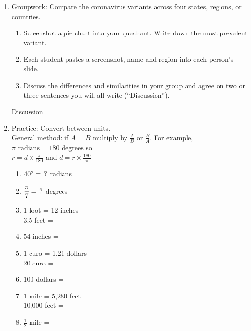 \documentclass[12pt, twoside]{article}
\begin{document}
\begin{enumerate}
\newpage
\item Groupwork: Compare the coronavirus variants across four states, regions, or countries.
\begin{enumerate}
  \item Screenshot a pie chart into your quadrant. Write down the most prevalent variant.
  \item Each student pastes a screenshot, name and region into each person's slide.
  \item Discuss the differences and similarities in your group and agree on two or three sentences you will all write (``Discussion'').
\end{enumerate}
\begin{center}
\end{center}
Discussion

\newpage
\item Practice: Convert between units. \\[0.25cm]
General method: if $A = B$ multiply by $\displaystyle \frac{A}{B} \text{ or } \frac{B}{A}$. For example, $\pi \text{ radians}= 180 \text{ degrees}$ so \\
$\displaystyle r = d \times \frac{\pi}{180}$ and 
$\displaystyle d = r \times \frac{180}{\pi}$
\vspace{0.5cm}
  \begin{multicols}{2}
  \raggedcolumns
  \begin{enumerate}[itemsep=1.5cm]
    \item $40^\circ = \hspace{0.15cm} ?$ radians
    \item $\displaystyle \frac{\pi}{7}  = \hspace{0.15cm} ?$ degrees
    \item 1 foot = 12 inches\\[0.5cm]
    3.5 feet = 
    \item 54 inches = 
    \item 1 euro = 1.21 dollars\\[0.5cm]
    20 euro = 
    \item 100 dollars = 
    \item 1 mile = 5,280 feet\\[0.5cm]
    10,000 feet = 
    \item $\frac{1}{2}$ mile =   
  \end{enumerate}
  \end{multicols}


\end{enumerate}
\end{document}
